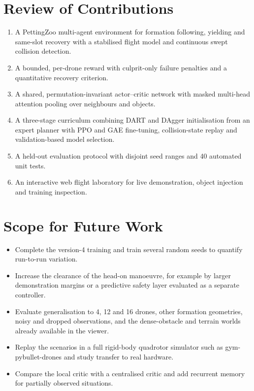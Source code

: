 \section{Review of Contributions}
\begin{enumerate}
  \item A PettingZoo multi-agent environment for formation following, yielding and same-slot recovery with a
        stabilised flight model and continuous swept collision detection.
  \item A bounded, per-drone reward with culprit-only failure penalties and a quantitative recovery criterion.
  \item A shared, permutation-invariant actor--critic network with masked multi-head attention pooling over
        neighbours and objects.
  \item A three-stage curriculum combining DART and DAgger initialisation from an expert planner with PPO and
        GAE fine-tuning, collision-state replay and validation-based model selection.
  \item A held-out evaluation protocol with disjoint seed ranges and 40 automated unit tests.
  \item An interactive web flight laboratory for live demonstration, object injection and training inspection.
\end{enumerate}

\section{Scope for Future Work}
\label{sec:future}
\begin{itemize}
  \item Complete the version-4 training and train several random seeds to quantify run-to-run variation.
  \item Increase the clearance of the head-on manoeuvre, for example by larger demonstration margins or a
        predictive safety layer evaluated as a separate controller.
  \item Evaluate generalisation to 4, 12 and 16 drones, other formation geometries, noisy and dropped
        observations, and the dense-obstacle and terrain worlds already available in the viewer.
  \item Replay the scenarios in a full rigid-body quadrotor simulator such as gym-pybullet-drones
        \cite{panerati2021learning} and study transfer to real hardware.
  \item Compare the local critic with a centralised critic \cite{yu2022surprising} and add recurrent memory for
        partially observed situations.
\end{itemize}
